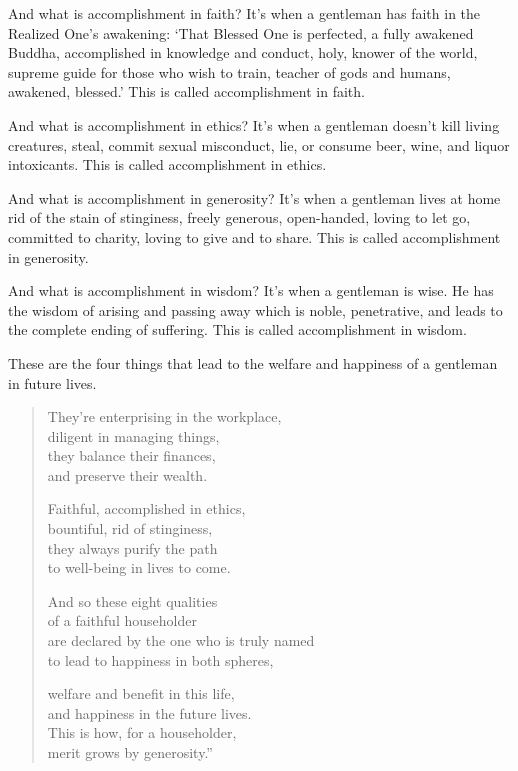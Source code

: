 \documentclass[12pt,openany]{book}%
\begin{document}
And what is accomplishment in faith? It’s when a gentleman has faith in the Realized One’s awakening: ‘That Blessed One is perfected, a fully awakened Buddha, accomplished in knowledge and conduct, holy, knower of the world, supreme guide for those who wish to train, teacher of gods and humans, awakened, blessed.’ This is called accomplishment in faith. 

And what is accomplishment in ethics? It’s when a gentleman doesn’t kill living creatures, steal, commit sexual misconduct, lie, or consume beer, wine, and liquor intoxicants. This is called accomplishment in ethics. 

And what is accomplishment in generosity? It’s when a gentleman lives at home rid of the stain of stinginess, freely generous, open-handed, loving to let go, committed to charity, loving to give and to share. This is called accomplishment in generosity. 

And what is accomplishment in wisdom? It’s when a gentleman is wise. He has the wisdom of arising and passing away which is noble, penetrative, and leads to the complete ending of suffering. This is called accomplishment in wisdom. 

These are the four things that lead to the welfare and happiness of a gentleman in future lives. 

\begin{verse}%
They’re enterprising in the workplace, \\
diligent in managing things, \\
they balance their finances, \\
and preserve their wealth. 

Faithful, accomplished in ethics, \\
bountiful, rid of stinginess, \\
they always purify the path \\
to well-being in lives to come. 

And so these eight qualities \\
of a faithful householder \\
are declared by the one who is truly named \\
to lead to happiness in both spheres, 

welfare and benefit in this life, \\
and happiness in the future lives. \\
This is how, for a householder, \\
merit grows by generosity.” 

%
\end{verse}
\end{document}
